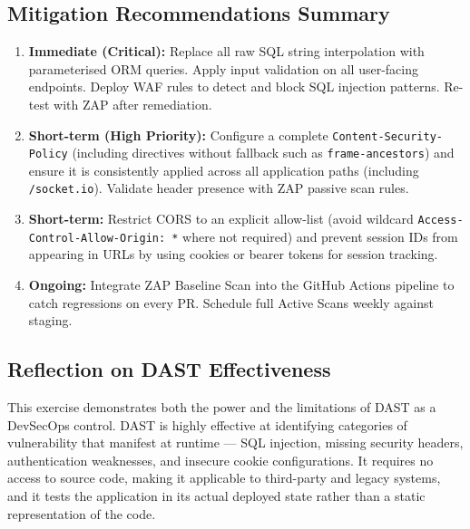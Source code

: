 \documentclass[12pt,a4paper]{article}
\begin{document}
\subsection{Mitigation Recommendations Summary}

\begin{enumerate}
  \item \textbf{Immediate (Critical):} Replace all raw SQL string interpolation with
    parameterised ORM queries. Apply input validation on all user-facing endpoints.
    Deploy WAF rules to detect and block SQL injection patterns. Re-test with ZAP after
    remediation.

  \item \textbf{Short-term (High Priority):} Configure a complete
    \texttt{Content-Security-Policy} (including directives without fallback such as
    \texttt{frame-ancestors}) and ensure it is consistently applied across all application
    paths (including \texttt{/socket.io}). Validate header presence with ZAP passive scan
    rules.

  \item \textbf{Short-term:} Restrict CORS to an explicit allow-list (avoid wildcard
    \texttt{Access-Control-Allow-Origin: *} where not required) and prevent session IDs
    from appearing in URLs by using cookies or bearer tokens for session tracking.

  \item \textbf{Ongoing:} Integrate ZAP Baseline Scan into the GitHub Actions pipeline
    to catch regressions on every PR. Schedule full Active Scans weekly against staging.
\end{enumerate}

\subsection{Reflection on DAST Effectiveness}

This exercise demonstrates both the power and the limitations of DAST as a DevSecOps
control. DAST is highly effective at identifying categories of vulnerability that manifest
at runtime --- SQL injection, missing security headers, authentication weaknesses, and
insecure cookie configurations. It requires no access to source code, making it applicable
to third-party and legacy systems, and it tests the application in its actual deployed
state rather than a static representation of the code.
\end{document}

